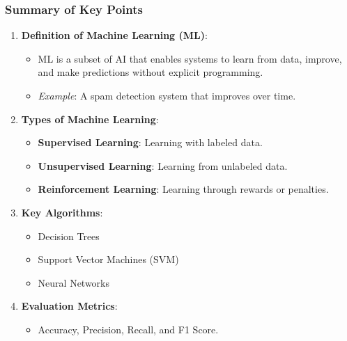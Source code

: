 \documentclass[aspectratio=169]{beamer}
\begin{document}
\begin{frame}[fragile]
    \frametitle{Summary of Key Points}
    \begin{enumerate}
        \item \textbf{Definition of Machine Learning (ML)}:
        \begin{itemize}
            \item ML is a subset of AI that enables systems to learn from data, improve, and make predictions without explicit programming.
            \item \textit{Example}: A spam detection system that improves over time.
        \end{itemize}

        \item \textbf{Types of Machine Learning}:
        \begin{itemize}
            \item \textbf{Supervised Learning}: Learning with labeled data.
            \item \textbf{Unsupervised Learning}: Learning from unlabeled data.
            \item \textbf{Reinforcement Learning}: Learning through rewards or penalties.
        \end{itemize}

        \item \textbf{Key Algorithms}:
        \begin{itemize}
            \item Decision Trees
            \item Support Vector Machines (SVM)
            \item Neural Networks
        \end{itemize}

        \item \textbf{Evaluation Metrics}:
        \begin{itemize}
            \item Accuracy, Precision, Recall, and F1 Score.
        \end{itemize}
    \end{enumerate}
\end{frame}
\end{document}
